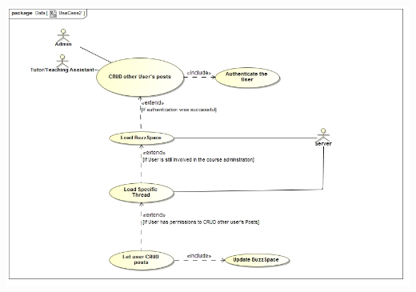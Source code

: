 \documentclass[a4paper,12pt]{report}
\begin{document}
\begin{itemize}
	\begin{center}
  	\includegraphics[width=1\textwidth]{../Functional_Requirements_Diagrams/UseCases1,2,3 - Kale-ab Tessera/UseCase2.jpg}\\[0.4cm]    
	\end{center}\end{itemize} 
\end{document}

